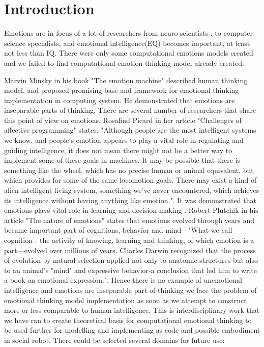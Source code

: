 

\section{Introduction}

Emotions are in focus of a lot of researchers from neuro-scientists \cite{emotionsbraintorobot, parsingreward, neuromodulatory, cubeofemotions, natureofemotions}, to computer science specialists\cite{emotionandsociable, senticcomputing, hourglass, affectivemodelofinterplay, affectivecomputing}, and emotional intelligence(EQ) becomes important, at least not less than IQ.
There were only some computational emotions models created\cite{computationalmodelsemotion, computationalmodelsemotionscognition, evaluatingcomutationalmodel, threelevel} and we failed to find computational emotion thinking model already created.

Marvin Minsky in his book "The emotion machine"\cite{emotionmachine} described human thinking model, and proposed promising base and framework for emotional thinking implementation in computing system. He demonstrated that emotions are inseparable parts of thinking. There are several number of researchers that share this point of view on emotions. Rosalind Picard in her article\cite{affectivecomputingchallanges} "Challenges of affective programming" states: "Although people are the most intelligent systems we know, and people’s emotion appears to play a vital role in regulating and guiding intelligence, it does not mean there might not be a better way to implement some of these goals in machines. It may be possible that there is something like the wheel, which has no precise human or animal equivalent, but which provides for some of the same locomotion goals. There may exist a kind of alien intelligent living system, something we’ve never encountered, which achieves its intelligence without having anything like emotion.". It was demonstrated that emotions plays vital role in learning and decision making \cite{roleofemotions}. Robert Plutchik in his article "The nature of emotions" \cite{natureofemotions} states that emotions evolved through years and became important part of cognitions, behavior and mind - "What we call cognition - the activity of knowing, learning and thinking, of which emotion is a part—evolved over millions of years. Charles Darwin recognized that the process of evolution by natural selection applied not only to anatomic structures but also to an animal’s "mind" and expressive behavior-a conclusion that led him to write a book on emotional expression.". Hence there is no example of unemotional intelligence and emotions are inseparable part of thinking we face the problem of emotional thinking model implementation as soon as we attempt to construct more or less comparable to human intelligence. This is interdisciplinary work that we have ran to create theoretical basis for computational emotional thinking to be used further for modelling and implementing as code and possible embodiment in social robot. There could be selected several domains for future use:

